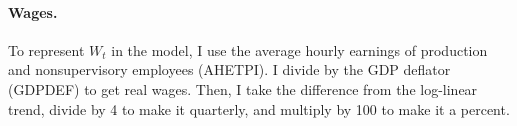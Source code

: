 \paragraph{Wages.}
To represent $W_t$ in the model, I use the average hourly earnings of production and nonsupervisory employees (AHETPI). I divide by the GDP deflator (GDPDEF) to get real wages. Then, I take the difference from the log-linear trend, divide by 4 to make it quarterly, and multiply by 100 to make it a percent.
